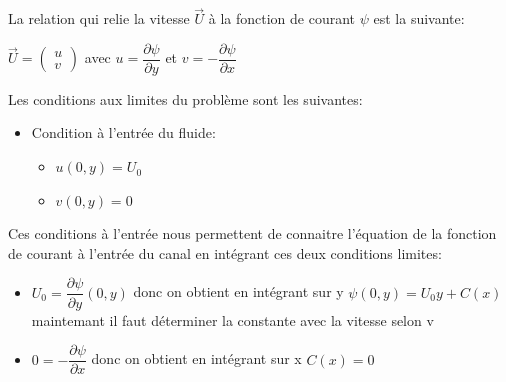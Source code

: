 \documentclass[a4paper,11pt]{report} %
\begin{document}
La relation qui relie la vitesse $\overrightarrow{U}$ à la fonction de courant $\psi$ est la suivante:
\begin{center}
$\overrightarrow{U}= \begin{pmatrix}  u \\  v   \end{pmatrix}$ avec $u=\dfrac{\partial \psi}{\partial y}$ et $v=-\dfrac{\partial \psi}{\partial x}$
\end{center}
Les conditions aux limites du problème sont les suivantes:
\begin{itemize} 
   \item Condition à l'entrée du fluide:
	\begin{itemize} 
   	     \item $u(0,y)=U_0$
   	     \item$v(0,y)=0$ 
	\end{itemize}
\end{itemize}
Ces conditions à l'entrée nous permettent de connaitre l'équation de la fonction de courant à l'entrée du canal en intégrant ces deux conditions limites:
\begin{itemize}
	     \item $U_0=\dfrac{\partial \psi}{\partial y}(0,y)$ donc on obtient en intégrant sur y  $\psi(0,y)=U_0y+C(x)$ maintemant il faut déterminer la constante avec la vitesse selon v
	     \item $0=-\dfrac{\partial \psi}{\partial x}$ donc on obtient en intégrant sur x  $C(x)=0$
\end{itemize}
\end{document}
